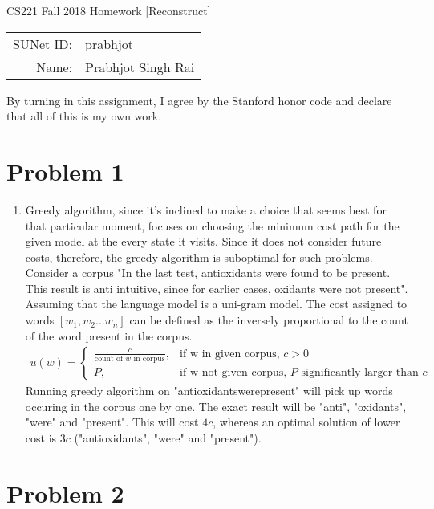 \documentclass[12pt]{article}
\begin{document}
\begin{center}
{\Large CS221 Fall 2018 Homework [Reconstruct]}

\begin{tabular}{rl}
SUNet ID: & prabhjot \\
Name: & Prabhjot Singh Rai
\end{tabular}
\end{center}

By turning in this assignment, I agree by the Stanford honor code and declare
that all of this is my own work.

\section*{Problem 1}

\begin{enumerate}[label=(\alph*)]
  \item Greedy algorithm, since it's inclined to make a choice that seems best for that particular moment, focuses on choosing the minimum cost path for the given model at the every state it visits. Since it does not consider future costs, therefore, the greedy algorithm is suboptimal for such problems. Consider a corpus "In the last test, antioxidants were found to be present. This result is anti intuitive, since for earlier cases, oxidants were not present". Assuming that the language model is a uni-gram model. The cost assigned to words $[w_1, w_2 ... w_n]$ can be defined as the inversely proportional to the count of the word present in the corpus. \\
  \begin{align*}
  u(w) = \begin{cases} 
  \frac{c}{\text{count of $w$ in corpus}}, & \text{if w in given corpus, $c > 0$} \\
  P, & \text{if w not given corpus, $P$ significantly larger than $c$}
  \end{cases}
  \end{align*}
  Running greedy algorithm on "antioxidantswerepresent" will pick up words occuring in the corpus one by one. The exact result will be "anti", "oxidants", "were" and "present". This will cost $4c$, whereas an optimal solution of lower cost is $3c$ ("antioxidants", "were" and "present").
  
\end{enumerate}

\section*{Problem 2}
\end{document}
